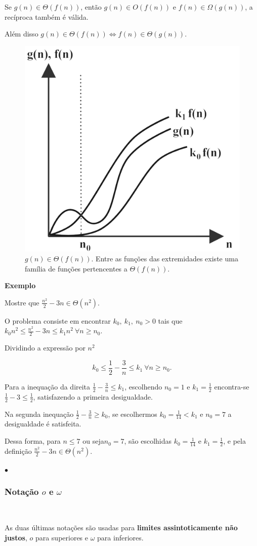 Se $g(n)\in\Theta(f(n))$, então $g(n)\in O(f(n))$ e $f(n)\in\Omega(g(n))$, a recíproca também é válida.

Além disso $g(n)\in\Theta(f(n)) \Leftrightarrow f(n)\in\Theta(g(n))$.

\begin{figure}
  \centering
  \includegraphics[width=0.4\linewidth]{img/Theta.png}
    \caption{$g(n)\in\Theta(f(n))$. Entre as funções das extremidades existe uma família de funções pertencentes a $\Theta(f(n))$.}
    \label{Theta}
\end{figure}

\textbf{Exemplo}

Mostre que $\frac{n^2}{2}-3n \in \Theta(n^2)$.

O problema consiste em encontrar $k_0, \ k_1, \ n_0 > 0$ tais que $k_0n^2\leq \frac{n^2}{2}-3n\leq k_1n^2 \ \forall n\geq n_0$.

Dividindo a expressão por $n^2$

\[k_0\leq \frac{1}{2} - \frac{3}{n} \leq k_1 \ \forall n\geq n_0.\]

Para a inequação da direita $\frac{1}{2}-\frac{3}{n}\leq k_1$, escolhendo $n_0=1$ e $k_1=\frac{1}{2}$ encontra-se $\frac{1}{2} -3 \leq \frac{1}{2}$, satisfazendo a primeira desigualdade.

Na segunda inequação $\frac{1}{2}-\frac{3}{n}\geq k_0$, se escolhermos $k_0=\frac{1}{14} < k_1$ e $n_0=7$ a desigualdade é satisfeita.

Dessa forma, para $n\leq 7$ ou seja$n_0=7$, são escolhidas $k_0=\frac{1}{14}$ e $k_1=\frac{1}{2}$, e pela definição $\frac{n^2}{2}-3n\in\Theta(n^2)$.

{\raggedleft $\bullet$ \par}

\subsubsection{Notação $o$ e $\omega$}
\

As duas últimas notações são usadas para \textbf{limites assintoticamente não justos}, $o$ para superiores e $\omega$ para inferiores.


